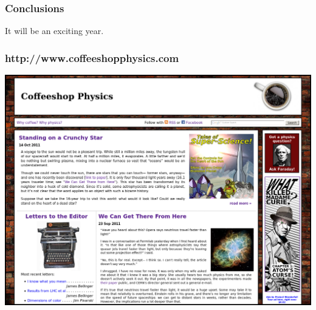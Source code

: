 \documentclass[compress]{beamer}
\begin{document}

\begin{frame}
\frametitle{Conclusions}

\begin{center}
It will be an exciting year.
\end{center}

\label{numpages}
\end{frame}

\begin{frame}
\frametitle{http://www.coffeeshopphysics.com}
\includegraphics[width=\linewidth]{coffeeshopphysics.png} \hfill
\end{frame}
\end{document}
